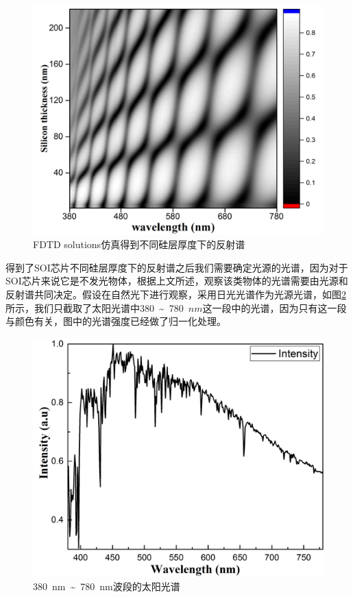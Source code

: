 \begin{figure}[htb]
	\centering
	\includegraphics[width=12cm]{./Pictures/color_reflection_all.jpg}
	\captionsetup{justification=centering}
	\caption{FDTD solutions仿真得到不同硅层厚度下的反射谱}
	\label{color_reflection_all}
\end{figure}

得到了SOI芯片不同硅层厚度下的反射谱之后我们需要确定光源的光谱，因为对于SOI芯片来说它是不发光物体，根据上文所述，观察该类物体的光谱需要由光源和反射谱共同决定。假设在自然光下进行观察，采用日光光谱作为光源光谱，如图\ref{color_sun_spectrum}所示，我们只截取了太阳光谱中380~\~{}~780~$nm$这一段中的光谱，因为只有这一段与颜色有关，图中的光谱强度已经做了归一化处理。

\begin{figure}[htb]
	\centering
	\includegraphics[width=12cm]{./Pictures/color_sun_spectrum.jpg}
	\captionsetup{justification=centering}
	\caption{380~nm~\~{}~780~nm波段的太阳光谱\cite{sunspectrum}}
	\label{color_sun_spectrum}
\end{figure}

